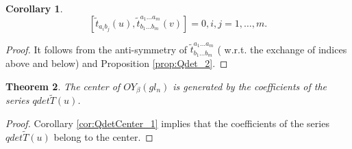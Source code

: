 \documentclass[10pt]{article}%
\numberwithin{equation}{section}
\newtheorem{thm}{Theorem}[section]
\newtheorem{cor}[thm]{Corollary}
\begin{document}
\begin{cor}\label{cor:QdetCenter_1}
    \[
    [\tilde{t}_{a_i b_j}(u),\tilde{t}_{b_1\ldots b_m}^{a_1\ldots a_m}(v)]=0, i,j=1,\ldots, m.
    \]
\end{cor}
\begin{proof}
    It follows from the anti-symmetry of $\tilde{t}_{b_1\ldots b_m}^{a_1\ldots a_m}$ ( w.r.t. the exchange of indices above and below) and Proposition \ref{prop:Qdet_2}.
\end{proof}
\begin{thm}\label{thm:QdetCenter}
    The center of $OY_{\beta}(gl_n)$ is generated by the coefficients of the series $qdet \tilde{T}(u)$.
\end{thm}
\begin{proof}
Corollary \eqref{cor:QdetCenter_1} implies that the coefficients of the series $qdet \tilde{T}(u)$ belong to the center.    
\end{proof}


\end{document}
